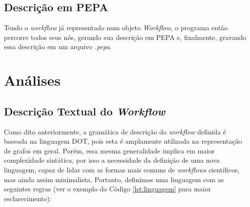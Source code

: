 \documentclass[a4paper,11pt]{article}
\begin{document}
	\newpage
    \subsection{Descrição em PEPA}
        Tendo o \emph{workflow} já representado num objeto \emph{Workflow}, o programa então percorre todos seus n\'os, gerando sua descrição em PEPA e, finalmente, gravando essa descrição em um arquivo \emph{.pepa}. 
        

        \newpage
  \section{Análises}
  	\subsection{Descrição Textual do \emph{Workflow}}
  		Como dito anteriormente, a gramática de descrição do \emph{workflow} definida é baseada na linguagem DOT, pois esta é amplamente utilizada na representação de grafos em geral. Porém, essa mesma generalidade implica em maior complexidade sintática, por isso a necessidade da definição de uma nova linguagem, capaz de lidar com as formas mais comuns de \emph{workflows} científicos, mas ainda assim minimalista. Portanto, definimos uma linguagem com as seguintes regras (ver o exemplo do Código \ref{lst:linguagem} para maior esclarecimento):
\end{document}
